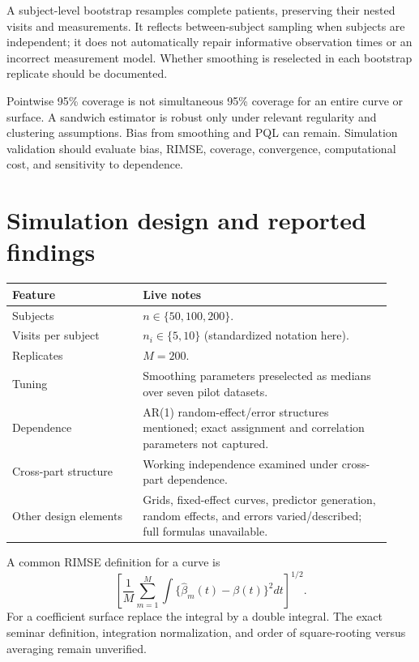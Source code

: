 \documentclass[11pt]{article}
\begin{document}
A subject-level bootstrap resamples complete patients, preserving their nested visits and measurements. It reflects between-subject sampling when subjects are independent; it does not automatically repair informative observation times or an incorrect measurement model. Whether smoothing is reselected in each bootstrap replicate should be documented.

Pointwise 95\% coverage is not simultaneous 95\% coverage for an entire curve or surface. A sandwich estimator is robust only under relevant regularity and clustering assumptions. Bias from smoothing and PQL can remain. Simulation validation should evaluate bias, RIMSE, coverage, convergence, computational cost, and sensitivity to dependence.
\section{Simulation design and reported findings}
\begin{longtable}{p{0.32\linewidth}p{0.61\linewidth}}
\toprule Feature & Live notes\\\midrule
Subjects & $n\in\{50,100,200\}$.\\
Visits per subject & $n_i\in\{5,10\}$ (standardized notation here).\\
Replicates & $M=200$.\\
Tuning & Smoothing parameters preselected as medians over seven pilot datasets.\\
Dependence & AR(1) random-effect/error structures mentioned; exact assignment and correlation parameters not captured.\\
Cross-part structure & Working independence examined under cross-part dependence.\\
Other design elements & Grids, fixed-effect curves, predictor generation, random effects, and errors varied/described; full formulas unavailable.\\\bottomrule
\end{longtable}
A common RIMSE definition for a curve is
\[
\left[\frac1M\sum_{m=1}^M\int\{\widehat\beta_m(t)-\beta(t)\}^2dt\right]^{1/2}.
\]
For a coefficient surface replace the integral by a double integral. The exact seminar definition, integration normalization, and order of square-rooting versus averaging remain unverified.
\end{document}
